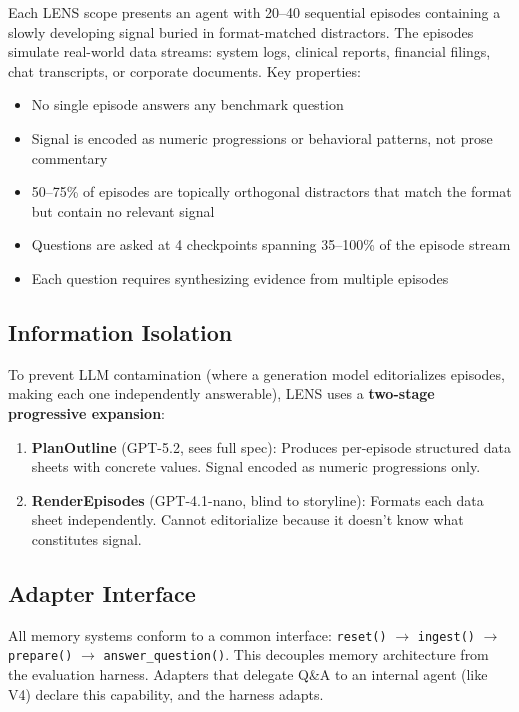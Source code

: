 \documentclass[11pt,letterpaper]{article}
\begin{document}
Each LENS scope presents an agent with 20--40 sequential episodes containing a slowly developing signal buried in format-matched distractors. The episodes simulate real-world data streams: system logs, clinical reports, financial filings, chat transcripts, or corporate documents. Key properties:

\begin{itemize}[nosep]
  \item No single episode answers any benchmark question
  \item Signal is encoded as numeric progressions or behavioral patterns, not prose commentary
  \item 50--75\% of episodes are topically orthogonal distractors that match the format but contain no relevant signal
  \item Questions are asked at 4 checkpoints spanning 35--100\% of the episode stream
  \item Each question requires synthesizing evidence from multiple episodes
\end{itemize}

\subsection{Information Isolation}

To prevent LLM contamination (where a generation model editorializes episodes, making each one independently answerable), LENS uses a \textbf{two-stage progressive expansion}:

\begin{enumerate}[nosep]
  \item \textbf{PlanOutline} (GPT-5.2, sees full spec): Produces per-episode structured data sheets with concrete values. Signal encoded as numeric progressions only.
  \item \textbf{RenderEpisodes} (GPT-4.1-nano, blind to storyline): Formats each data sheet independently. Cannot editorialize because it doesn't know what constitutes signal.
\end{enumerate}

\subsection{Adapter Interface}

All memory systems conform to a common interface: \texttt{reset()} $\to$ \texttt{ingest()} $\to$ \texttt{prepare()} $\to$ \texttt{answer\_question()}. This decouples memory architecture from the evaluation harness. Adapters that delegate Q\&A to an internal agent (like V4) declare this capability, and the harness adapts.
\end{document}
